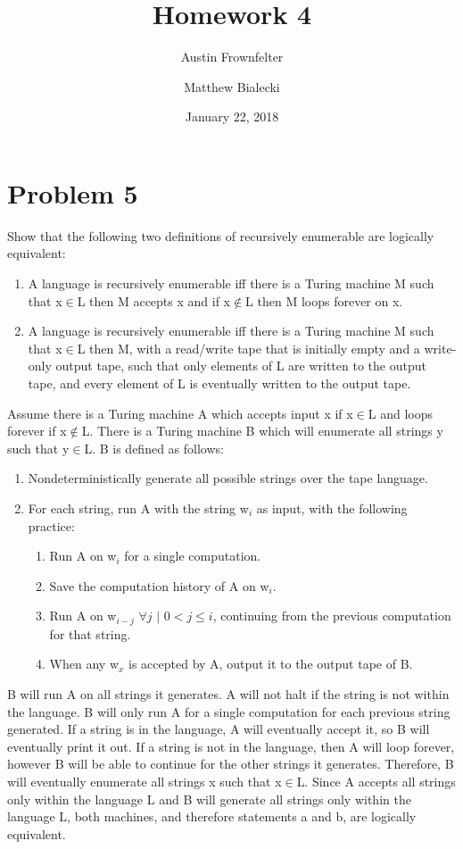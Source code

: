 \documentclass{article}
\title{Homework 4}
\author{Austin Frownfelter \and Matthew Bialecki}
\date{January 22, 2018}
\begin{document}
\maketitle

\section{Problem 5}
Show that the following two definitions of recursively enumerable are logically equivalent: 
\begin{enumerate}[label=(\alph*)]
\item A language is recursively enumerable iff there is a Turing machine M such that x$\in$L then M accepts x and if x$\not\in$L then M loops forever on x.
\item A language is recursively enumerable iff there is a Turing machine M such that x$\in$L then M, with a read/write tape that is initially empty and a write-only output tape, such that only  elements  of L are  written  to  the  output  tape,  and  every  element  of L is eventually written to the output tape.
\end{enumerate}

Assume there is a Turing machine A which accepts input x if x$\in$L and loops forever if x$\not\in$L.  There is a Turing machine B which will enumerate all strings y such that y$\in$L.  B is defined as follows:
\begin{enumerate}
\item Nondeterministically generate all possible strings over the tape language.
\item For each string, run A with the string w$_i$ as input, with the following practice:
\begin{enumerate}[label=\alph*.]
\item Run A on w$_i$ for a single computation.
\item Save the computation history of A on w$_i$.
\item Run A on w$_{i-j}$ $\forall j$ $|$ $0 < j \leq i$, continuing from the previous computation for that string.
\item When any w$_x$ is accepted by A, output it to the output tape of B.
\end{enumerate}
\end{enumerate}

B will run A on all strings it generates.  A will not halt if the string is not within the language.  B will only run A for a single computation for each previous string generated.  If a string is in the language, A will eventually accept it, so B will eventually print it out.  If a string is not in the language, then A will loop forever, however B will be able to continue for the other strings it generates. Therefore, B will eventually enumerate all strings x such that x$\in$L. Since A accepts all strings only within the language L and B will generate all strings only within the language L, both machines, and therefore statements a and b, are logically equivalent.
\end{document}
